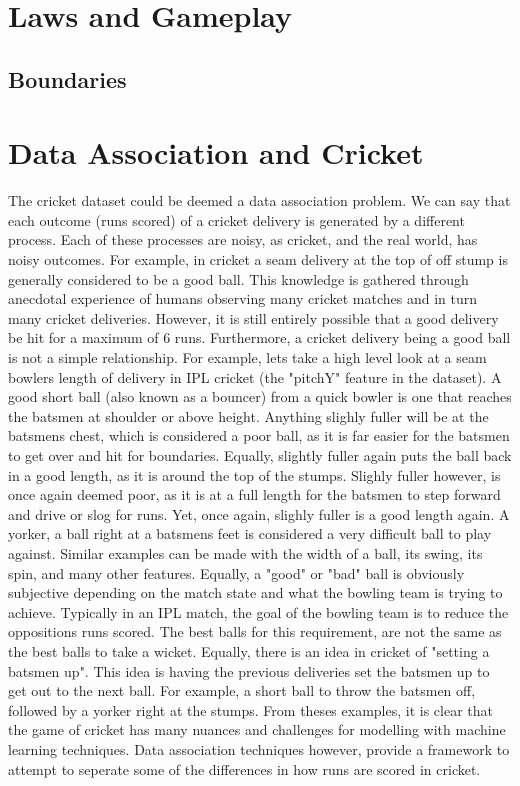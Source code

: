 \documentclass[12pt,a4paper]{report}
\begin{document}
\section{Laws and Gameplay}

\subsection{Boundaries} \label{sec:Boundaries}

\section{Data Association and Cricket}

The cricket dataset could be deemed a data association problem. 
We can say that each outcome (runs scored) of a cricket delivery is generated by a different process. 
Each of these processes are noisy, as cricket, and the real world, has noisy outcomes. 
For example, in cricket a seam delivery at the top of off stump is generally considered to be a good ball. 
This knowledge is gathered through anecdotal experience of humans observing many cricket matches and in turn many cricket deliveries.
However, it is still entirely possible that a good delivery be hit for a maximum of 6 runs. 
Furthermore, a cricket delivery being a good ball is not a simple relationship. 
For example, lets take a high level look at a seam bowlers length of delivery in IPL cricket (the "pitchY" feature in the dataset).
A good short ball (also known as a bouncer) from a quick bowler is one that reaches the batsmen at shoulder or above height. 
Anything slighly fuller will be at the batsmens chest, which is considered a poor ball, as it is far easier for the batsmen to get over and hit for boundaries.
Equally, slightly fuller again puts the ball back in a good length, as it is around the top of the stumps. 
Slighly fuller however, is once again deemed poor, as it is at a full length for the batsmen to step forward and drive or slog for runs. 
Yet, once again, slighly fuller is a good length again. 
A yorker, a ball right at a batsmens feet is considered a very difficult ball to play against. 
Similar examples can be made with the width of a ball, its swing, its spin, and many other features.
Equally, a "good" or "bad" ball is obviously subjective depending on the match state and what the bowling team is trying to achieve. 
Typically in an IPL match, the goal of the bowling team is to reduce the oppositions runs scored. 
The best balls for this requirement, are not the same as the best balls to take a wicket. 
Equally, there is an idea in cricket of "setting a batsmen up". 
This idea is having the previous deliveries set the batsmen up to get out to the next ball. 
For example, a short ball to throw the batsmen off, followed by a yorker right at the stumps. 
From theses examples, it is clear that the game of cricket has many nuances and challenges for modelling with machine learning techniques. 
Data association techniques however, provide a framework to attempt to seperate some of the differences in how runs are scored in cricket. 
\end{document}
